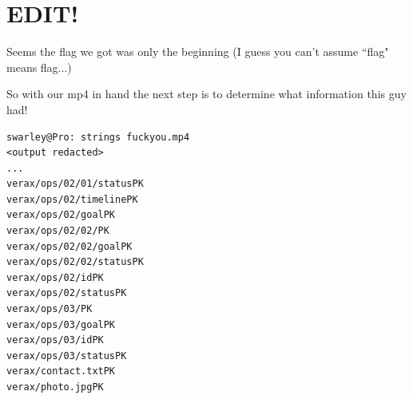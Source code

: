 \documentclass[11pt]{report}
\begin{document}



\section{EDIT!}
Seems the flag we got was only the beginning (I guess you can't assume ``flag" means flag...)

So with our mp4 in hand the next step is to determine what information this guy had!

\begin{lstlisting}
swarley@Pro: strings fuckyou.mp4
<output redacted>
...
verax/ops/02/01/statusPK
verax/ops/02/timelinePK
verax/ops/02/goalPK
verax/ops/02/02/PK
verax/ops/02/02/goalPK
verax/ops/02/02/statusPK
verax/ops/02/idPK
verax/ops/02/statusPK
verax/ops/03/PK
verax/ops/03/goalPK
verax/ops/03/idPK
verax/ops/03/statusPK
verax/contact.txtPK
verax/photo.jpgPK

\end{lstlisting}
\end{document}
